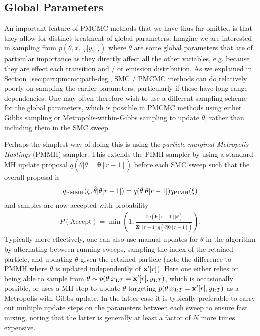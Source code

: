 \subsection{Global Parameters}
\label{sec:part:pmcmc:global}

An important feature of PMCMC methods that we have thus far omitted is that they allow for
distinct treatment of global parameters.  Imagine we are interested in sampling from $p(\theta,x_{1:T} | y_{1:T})$
where $\theta$ are some global parameters that are of particular importance as they directly
affect all the other variables, e.g. because they are effect each transition and / or emission distribution.
As we explained in Section~\ref{sec:part:pmcmc:path-deg}, SMC / PMCMC methods can do relatively poorly on sampling
the earlier parameters, particularly if these have long range dependencies. One may often therefore wish 
to use a different sampling scheme
for the global parameters, which is possible in PMCMC methods using either Gibbs sampling or Metropolis-within-Gibbs
sampling to update $\theta$, rather than including them in the SMC sweep.

Perhaps the simplest way of doing this is using the \emph{particle marginal Metropolis-Hastings} (PMMH)
sampler.  This extends the PIMH sampler by using a standard MH update proposal $q(\hat{\theta}|\theta=\mathbf{\theta}[r-1])$ 
before each SMC sweep such that the overall proposal is
\begin{align}
q_{\text{PMMH}}(\mathbf{\xi},\hat{\theta}|\mathbf{\theta}[r-1]) = q(\hat{\theta}|\mathbf{\theta}[r-1]) q_{\text{PIMH}}(\mathbf{\xi})
\end{align}
and samples are now accepted with probability
\begin{align}
P(\text{Accept}) = \min \left(1,\frac{\hat{Z} q(\mathbf{\theta}[r-1] | \hat{\theta})}
{\mathbf{Z}'[r-1] q(\hat{\theta}|\mathbf{\theta}[r-1])}\right).
\end{align}
Typically more effectively, one can also use manual updates for $\theta$ in the \pg algorithm by alternating
between running \csmc sweeps, sampling the index of the retained particle, and updating $\theta$ given
the retained particle (note the difference to PMMH where $\theta$ is updated independently of $\mathbf{x}'[r]$).
Here one either relies on being able to sample from $\theta \sim p(\theta | x_{1:T}=\mathbf{x}'[r], y_{1:T})$, which is 
occasionally possible, or uses a MH step to update $\theta$ targeting $p(\theta | x_{1:T}=\mathbf{x}'[r], y_{1:T})$ as
a Metropolis-with-Gibbs update.  In the latter case it is typically preferable to carry out multiple update steps
on the parameters between each \csmc sweep to ensure fast mixing, noting that the latter is generally at least a 
factor of $N$ more times expensive.

